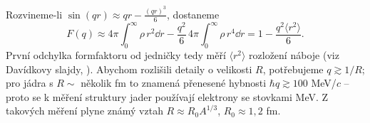 \begin{vysvetleni}
Rozvineme-li $\sin(qr) \approx qr - \frac{(qr)^3}{6}$, dostaneme
\[
  F(q) \approx 4\pi\int_0^\infty\rho\,r^2\dd r - \frac{q^2}{6}\,4\pi\int_0^\infty\rho\,r^4\dd r = 1-\frac{q^2\langle r^2\rangle}{6}.
\]
První odchylka formfaktoru od jedničky tedy měří  $\langle r^2\rangle$ rozložení náboje (viz Davídkovy slajdy, ). Abychom rozlišili detaily o velikosti $R$, potřebujeme $q\gtrsim1/R$; pro jádra s $R\sim$ několik fm to znamená přenesené hybnosti $\hbar q\gtrsim 100$ MeV/$c$ -- proto se k měření struktury jader používají elektrony se stovkami MeV. Z takových měření plyne známý vztah $R\approx R_0A^{1/3}$, $R_0\approx1{,}2$ fm.
\end{vysvetleni}
